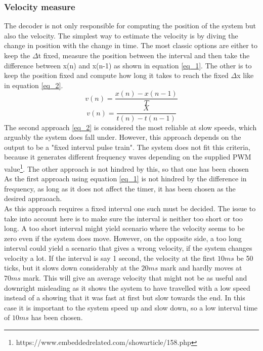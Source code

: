 \documentclass[../../../main]{subfiles}
\begin{document}
\subsubsection{Velocity measure}
The decoder is not only responsible for computing the position of the system but also the velocity. The simplest way to estimate the velocity is by diving the change in position with the change in time. The most classic options are either to keep the $\Delta$t fixed, measure the position between the interval and then take the difference between x(n) and x(n-1) as shown in equation \ref{eq_1}. The other is to keep the position fixed and compute how long it takes to reach the fixed  $\Delta$x like in equation \ref{eq_2}.
\begin{equation}
v(n) = \frac{x(n)-x(n-1)}{T}
\label{eq_1}
\end{equation}
\begin{equation}
  v(n) = \frac{X}{t(n)-t(n-1)}
  \label{eq_2}
\end{equation}
The second approach \ref{eq_2} is considered the most reliable at slow speeds, which arguably the system does fall under. However, this approach depends on the output to be a "fixed interval pulse train". The system does not fit this criteria, because it generates different frequency waves depending on the supplied PWM value\footnote{https://www.embeddedrelated.com/showarticle/158.php}. The other approach is not hindred by this, so that one has been chosen
As the first approach using equation \ref{eq_1} is not hindred by the difference in frequency, as long as it does not affect the timer, it has been chosen as the desired appraoach. \\
As this approach requires a fixed interval one such must be decided. The issue to take into account here is to make sure the interval is neither too short or too long. A too short interval might yield scenario where the velocity seems to be zero even if the system does move. However, on the opposite side, a too long interval could yield a scenario that gives a wrong velocity, if the system changes velocity a lot. If the interval is say 1 second, the velocity at the first $10ms$ be 50 ticks, but it slows down considerably at the $20ms$ mark and hardly moves at $70ms$ mark. This will give an average velocity that might not be as useful and downright misleading as it shows the system to have travelled with a low speed instead of a showing that it was fast at first but slow towards the end. In this case it is important to the system speed up and slow down, so a low interval time of $10ms$ has been chosen.
\end{document}
